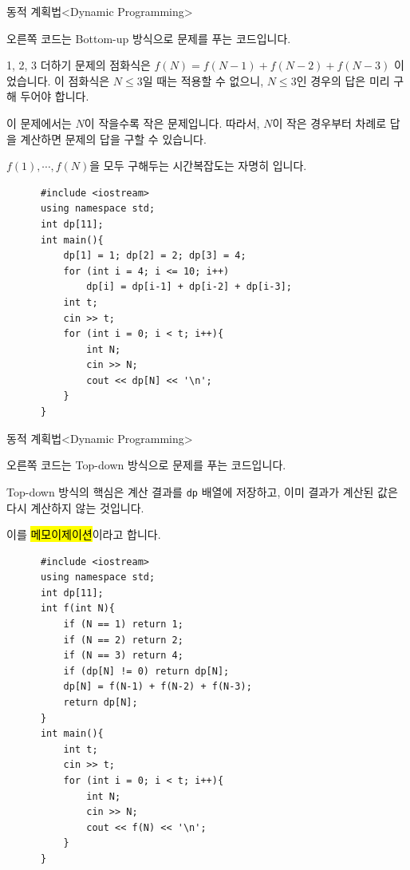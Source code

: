 \begin{frame}[fragile]{동적 계획법}{<Dynamic Programming>}
  \begin{twocol}
    오른쪽 코드는 \alert{Bottom-up 방식}으로 문제를 푸는 코드입니다.\par\vspace{1mm}
    1, 2, 3 더하기 문제의 점화식은 $f(N) = f(N{-}1) + f(N{-}2) + f(N{-}3)$ 이었습니다.
    이 점화식은 $N \le 3$일 때는 적용할 수 없으니, $N \le 3$인 경우의 답은 미리 구해 두어야 합니다.\par\vspace{1mm}
    이 문제에서는 $N$이 작을수록 작은 문제입니다. 따라서, $N$이 작은 경우부터 차례로 답을
    계산하면 문제의 답을 구할 수 있습니다.\par\vspace{1mm}
    $f(1), \cdots, f(N)$을 모두 구해두는 시간복잡도는 자명히 입니다.
  \colsplit
    \begin{verbatim}
      #include <iostream>
      using namespace std;
      int dp[11];
      int main(){
          dp[1] = 1; dp[2] = 2; dp[3] = 4;
          for (int i = 4; i <= 10; i++)
              dp[i] = dp[i-1] + dp[i-2] + dp[i-3];
          int t;
          cin >> t;
          for (int i = 0; i < t; i++){
              int N;
              cin >> N;
              cout << dp[N] << '\n';
          }
      }
    \end{verbatim}
  \end{twocol}
\end{frame}

\begin{frame}[fragile]{동적 계획법}{<Dynamic Programming>}
  \begin{twocol}
    오른쪽 코드는 \alert{Top-down 방식}으로 문제를 푸는 코드입니다.\par\vspace{2mm}
    Top-down 방식의 핵심은 계산 결과를 \texttt{dp} 배열에 저장하고, 이미 결과가 계산된
    값은 다시 계산하지 않는 것입니다.\par\vspace{2mm}
    이를 \hl{메모이제이션}이라고 합니다.
  \colsplit
    \begin{verbatim}
      #include <iostream>
      using namespace std;
      int dp[11];
      int f(int N){
          if (N == 1) return 1;
          if (N == 2) return 2;
          if (N == 3) return 4;
          if (dp[N] != 0) return dp[N];
          dp[N] = f(N-1) + f(N-2) + f(N-3);
          return dp[N];
      }
      int main(){
          int t;
          cin >> t;
          for (int i = 0; i < t; i++){
              int N;
              cin >> N;
              cout << f(N) << '\n';
          }
      }
    \end{verbatim}
  \end{twocol}
\end{frame}

